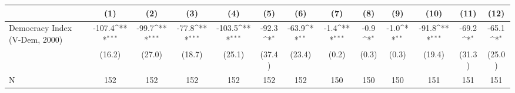 {
\def\sym#1{\ifmmode^{#1}\else\(^{#1}\)\fi}
\begin{tabular}{l*{12}{c}}
\hline\hline
                    &\multicolumn{1}{c}{(1)}         &\multicolumn{1}{c}{(2)}         &\multicolumn{1}{c}{(3)}         &\multicolumn{1}{c}{(4)}         &\multicolumn{1}{c}{(5)}         &\multicolumn{1}{c}{(6)}         &\multicolumn{1}{c}{(7)}         &\multicolumn{1}{c}{(8)}         &\multicolumn{1}{c}{(9)}         &\multicolumn{1}{c}{(10)}         &\multicolumn{1}{c}{(11)}         &\multicolumn{1}{c}{(12)}         \\
\hline
Democracy Index (V-Dem, 2000)&      -107.4\sym{***}&       -99.7\sym{***}&       -77.8\sym{***}&      -103.5\sym{***}&       -92.3\sym{*}  &       -63.9\sym{**} &        -1.4\sym{***}&        -0.9\sym{*}  &        -1.0\sym{**} &       -91.8\sym{***}&       -69.2\sym{*}  &       -65.1\sym{*}  \\
                    &      (16.2)         &      (27.0)         &      (18.7)         &      (25.1)         &      (37.4)         &      (23.4)         &       (0.2)         &       (0.3)         &       (0.3)         &      (19.4)         &      (31.3)         &      (25.0)         \\
\hline
N                   &         152         &         152         &         152         &         152         &         152         &         152         &         150         &         150         &         150         &         151         &         151         &         151         \\
\hline\hline
\end{tabular}
}
